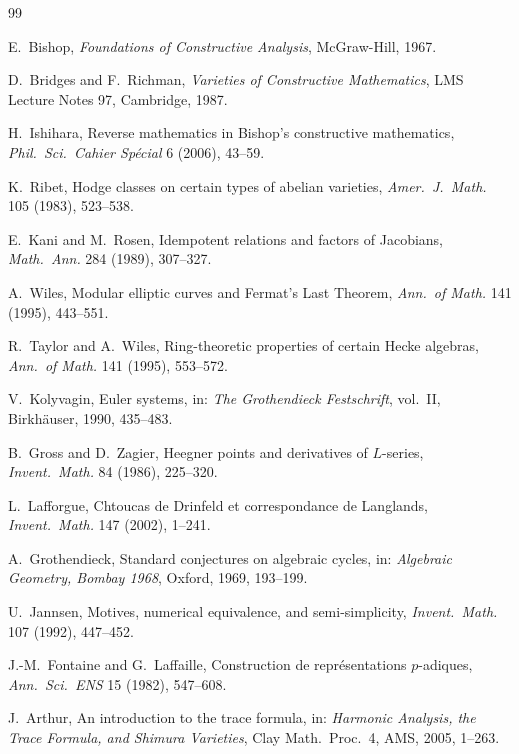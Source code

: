 \documentclass[11pt,a4paper]{article}
\theoremstyle{plain}
\theoremstyle{definition}
\begin{document}
\begin{thebibliography}{99}

 E.\ Bishop, \emph{Foundations of Constructive Analysis}, McGraw-Hill, 1967.

 D.\ Bridges and F.\ Richman, \emph{Varieties of Constructive Mathematics}, LMS Lecture Notes 97, Cambridge, 1987.

 H.\ Ishihara, Reverse mathematics in Bishop's constructive mathematics, \emph{Phil.\ Sci.\ Cahier Sp\'ecial} 6 (2006), 43--59.

 K.\ Ribet, Hodge classes on certain types of abelian varieties, \emph{Amer.\ J.\ Math.} 105 (1983), 523--538.

 E.\ Kani and M.\ Rosen, Idempotent relations and factors of Jacobians, \emph{Math.\ Ann.} 284 (1989), 307--327.

 A.\ Wiles, Modular elliptic curves and Fermat's Last Theorem, \emph{Ann.\ of Math.} 141 (1995), 443--551.

 R.\ Taylor and A.\ Wiles, Ring-theoretic properties of certain Hecke algebras, \emph{Ann.\ of Math.} 141 (1995), 553--572.



 V.\ Kolyvagin, Euler systems, in: \emph{The Grothendieck Festschrift}, vol.~II, Birkh\"auser, 1990, 435--483.

 B.\ Gross and D.\ Zagier, Heegner points and derivatives of $L$-series, \emph{Invent.\ Math.} 84 (1986), 225--320.

 L.\ Lafforgue, Chtoucas de Drinfeld et correspondance de Langlands, \emph{Invent.\ Math.} 147 (2002), 1--241.

 A.\ Grothendieck, Standard conjectures on algebraic cycles, in: \emph{Algebraic Geometry, Bombay 1968}, Oxford, 1969, 193--199.

 U.\ Jannsen, Motives, numerical equivalence, and semi-simplicity, \emph{Invent.\ Math.} 107 (1992), 447--452.

 J.-M.\ Fontaine and G.\ Laffaille, Construction de repr\'esentations $p$-adiques, \emph{Ann.\ Sci.\ ENS} 15 (1982), 547--608.

 J.\ Arthur, An introduction to the trace formula, in: \emph{Harmonic Analysis, the Trace Formula, and Shimura Varieties}, Clay Math.\ Proc.\ 4, AMS, 2005, 1--263.


\end{thebibliography}
\end{document}
